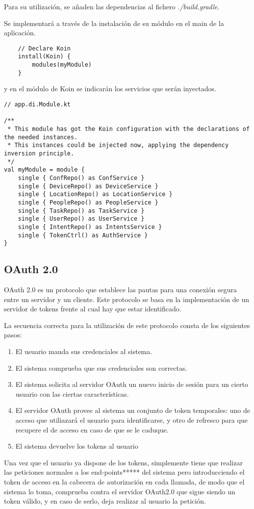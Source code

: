 Para su utilización, se añaden las dependencias al fichero \textit{./build.gradle}.

Se implementará a través de la instalación de su módulo en el main de la aplicación.
\begin{lstlisting}
    // Declare Koin
    install(Koin) {
        modules(myModule)
    }
\end{lstlisting}

y en el módulo de Koin se indicarán los servicios que serán inyectados.
\begin{lstlisting}
// app.di.Module.kt

/**
 * This module has got the Koin configuration with the declarations of the needed instances.
 * This instances could be injected now, applying the dependency inversion principle.
 */
val myModule = module {
    single { ConfRepo() as ConfService }
    single { DeviceRepo() as DeviceService }
    single { LocationRepo() as LocationService }
    single { PeopleRepo() as PeopleService }
    single { TaskRepo() as TaskService }
    single { UserRepo() as UserService }
    single { IntentRepo() as IntentsService }
    single { TokenCtrl() as AuthService }
}
\end{lstlisting}


    \subsection{OAuth 2.0}
    
OAuth 2.0 es un protocolo que establece las pautas para una conexión segura entre un servidor y un cliente.
Este protocolo se basa en la implementación de un servidor de tokens frente al cual hay que estar identificado.

La secuencia correcta para la utilización de este protocolo consta de los siguientes pasos:

\begin{enumerate}
        \item El usuario manda sus credenciales al sistema.
        \item El sistema comprueba que sus credenciales son correctas.
        \item El sistema solicita al servidor OAuth un nuevo inicio de sesión para un cierto usuario con las ciertas características.
        \item El servidor OAuth provee al sistema un conjunto de token temporales: uno de acceso que utiliazará el usuario para identificarse, y otro de refresco para que recupere el de acceso en caso de que se le caduque.
        \item El sistema devuelve los tokens al usuario
\end{enumerate}
Una vez que el usuario ya dispone de los tokens, simplemente tiene que realizar las peticiones normales a los end-points***** del sistema pero introducciendo el token de acceso en la cabecera de autorización en cada llamada, de modo que el sistema lo toma, comprueba contra el servidor OAuth2.0 que sigue siendo un token válido, y en caso de serlo, deja realizar al usuario la petición.

